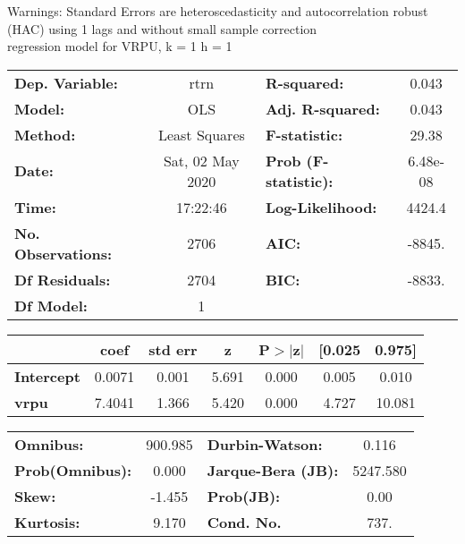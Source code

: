 Warnings: \newline
 [1] Standard Errors are heteroscedasticity and autocorrelation robust (HAC) using 1 lags and without small sample correction\\ 

regression model for VRPU, k = 1 h = 1\begin{center}
\begin{tabular}{lclc}
\toprule
\textbf{Dep. Variable:}    &       rtrn       & \textbf{  R-squared:         } &     0.043   \\
\textbf{Model:}            &       OLS        & \textbf{  Adj. R-squared:    } &     0.043   \\
\textbf{Method:}           &  Least Squares   & \textbf{  F-statistic:       } &     29.38   \\
\textbf{Date:}             & Sat, 02 May 2020 & \textbf{  Prob (F-statistic):} &  6.48e-08   \\
\textbf{Time:}             &     17:22:46     & \textbf{  Log-Likelihood:    } &    4424.4   \\
\textbf{No. Observations:} &        2706      & \textbf{  AIC:               } &    -8845.   \\
\textbf{Df Residuals:}     &        2704      & \textbf{  BIC:               } &    -8833.   \\
\textbf{Df Model:}         &           1      & \textbf{                     } &             \\
\bottomrule
\end{tabular}
\begin{tabular}{lcccccc}
                   & \textbf{coef} & \textbf{std err} & \textbf{z} & \textbf{P$> |$z$|$} & \textbf{[0.025} & \textbf{0.975]}  \\
\midrule
\textbf{Intercept} &       0.0071  &        0.001     &     5.691  &         0.000        &        0.005    &        0.010     \\
\textbf{vrpu}      &       7.4041  &        1.366     &     5.420  &         0.000        &        4.727    &       10.081     \\
\bottomrule
\end{tabular}
\begin{tabular}{lclc}
\textbf{Omnibus:}       & 900.985 & \textbf{  Durbin-Watson:     } &    0.116  \\
\textbf{Prob(Omnibus):} &   0.000 & \textbf{  Jarque-Bera (JB):  } & 5247.580  \\
\textbf{Skew:}          &  -1.455 & \textbf{  Prob(JB):          } &     0.00  \\
\textbf{Kurtosis:}      &   9.170 & \textbf{  Cond. No.          } &     737.  \\
\bottomrule
\end{tabular}
\end{center}

